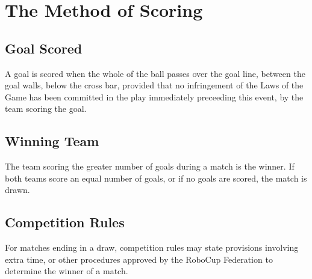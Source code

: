 \section{The Method of Scoring}\label{sec:method-of-scoring}

\subsection{Goal Scored}
A goal is scored when the whole of the ball passes over the goal line, between the goal walls, below the cross bar, provided that no infringement of the Laws of the Game has been committed in the play immediately preceeding this event, by the team scoring the goal.

\subsection{Winning Team}
The team scoring the greater number of goals during a match is the winner.
If both teams score an equal number of goals, or if no goals are scored, the match is drawn.

\subsection{Competition Rules}
For matches ending in a draw, competition rules may state provisions involving extra time, or other procedures approved by the RoboCup Federation to determine the winner of a match.

